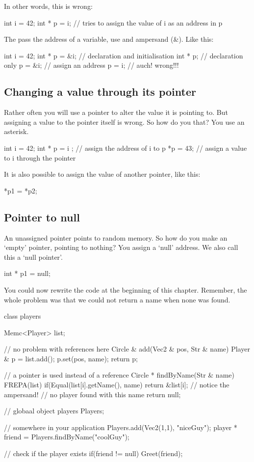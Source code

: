 In other words, this is wrong:
\begin{code}
int i = 42;
int * p = i; // tries to assign the value of i as an address in p
\end{code}

The pass the address of a variable, use and ampersand (\&). Like this:

\begin{code}
int   i = 42;
int * p = &i; // declaration and initialisation
int * p;      // declaration only
p       = &i; // assign an address
p       =  i; // auch! wrong!!! 
\end{code}    


\subsection{Changing a value through its pointer}
Rather often you will use a pointer to alter the value it is pointing to. But assigning a value to the pointer itself is wrong. So how do you that? You use an asterisk.

\begin{code}
int   i = 42;
int * p = i ; // assign the address of i to p
*p      = 43; // assign a value to i through the pointer
\end{code}

It is also possible to assign the value of another pointer, like this:

\begin{code}
*p1 = *p2;
\end{code}

\subsection{Pointer to null}
An unassigned pointer points to random memory. So how do you make an `empty' pointer, pointing to nothing? You assign a `null' address. We also call this a `null pointer'.

\begin{code}
int * p1 = null;
\end{code}

You could now rewrite the code at the beginning of this chapter. Remember, the whole problem was that we could not return a name when none was found.

\begin{code}
class players {
  Memc<Player> list;
  
  // no problem with references here
  Circle &  add(Vec2 & pos, Str & name) {
    Player & p = list.add();
    p.set(pos, name);
    return p;
  }	  

  // a pointer is used instead of a reference
  Circle * findByName(Str & name) {
    FREPA(list) {
      if(Equal(list[i].getName(), name) {
        return &list[i]; // notice the ampersand!
      }
    }
    // no player found with this name
    return null;
  }	
}
// globaal object
players Players;

// somewhere in your application
Players.add(Vec2(1,1), "niceGuy");
player * friend = Players.findByName("coolGuy");

// check if the player exists
if(friend != null) {
  Greet(friend);
}
\end{code} 

